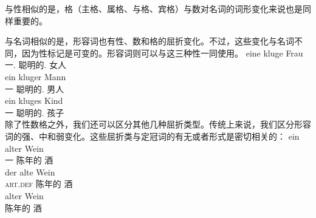 与性相似的是，格（主格、属格、与格、宾格）与数对名词的词形变化来说也是同样重要的。

与名词相似的是，形容词也有性、数和格的屈折变化。不过，这些变化与名词不同，因为性标记是可变的。形容词则可以与这三种性一同使用。
\eal
\ex 
\gll eine kluge Frau\\
	 一.\fem{} 聪明的.\fem{} 女人\\
\ex 
\gll ein kluger Mann\\
	 一 聪明的.\mas{} 男人\\
\ex 
\gll ein kluges Kind\\
	 一 聪明的.\neu{} 孩子\\
\zl
除了性数格之外，我们还可以区分其他几种屈折类型\label{page-Flexionsklasse-Wunderlich}。传统上来说，我们区分形容词的强、中和弱变化。这些屈折类与定冠词的有无或者形式是密切相关的：
\eal
\ex 
\gll ein alter Wein\\
     一 陈年的 酒\\
\ex
\gll der alte Wein\\
     \textsc{art}.\textsc{def} 陈年的 酒\\
\ex 
\gll alter Wein\\
     陈年的 酒\\
\zl

